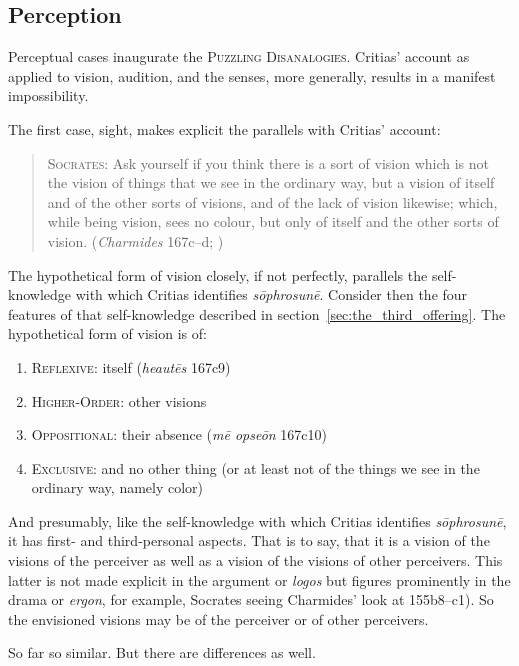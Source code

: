 
\subsection{Perception} %
\label{sub:perception}

Perceptual cases inaugurate the \textsc{Puzzling Disanalogies}. Critias' account as applied to vision, audition, and the senses, more generally, results in a manifest impossibility.

The first case, sight, makes explicit the parallels with Critias' account:
\begin{quote}
	\textsc{Socrates}: Ask yourself if you think there is a sort of vision which is not the vision of things that we see in the ordinary way, but a vision of itself and of the other sorts of visions, and of the lack of vision likewise; which, while being vision, sees no colour, but only of itself and the other sorts of vision. (\emph{Charmides} 167c–d; \citealt[59]{Lamb:1927qw})
\end{quote}
The hypothetical form of vision closely, if not perfectly, parallels the self-knowledge with which Critias identifies \emph{sōphrosunē}. Consider then the four features of that self-knowledge described in section~\ref{sec:the_third_offering}. The hypothetical form of vision is of:
\begin{enumerate}[(1)]
	\item \textsc{Reflexive}: itself (\emph{heautēs} 167c9)
	\item \textsc{Higher-Order}: other visions
	\item \textsc{Oppositional}: their absence (\emph{mē opseōn} 167c10)
	\item \textsc{Exclusive}: and no other thing (or at least not of the things we see in the ordinary way, namely color)
\end{enumerate}
And presumably, like the self-knowledge with which Critias identifies \emph{sōphrosunē}, it has first- and third-personal aspects. That is to say, that it is a vision of the visions of the perceiver as well as a vision of the visions of other perceivers. This latter is not made explicit in the argument or \emph{logos} but figures prominently in the drama or \emph{ergon}, for example, Socrates seeing Charmides' look at 155b8–c1). So the envisioned visions may be of the perceiver or of other perceivers.

So far so similar. But there are differences as well.

